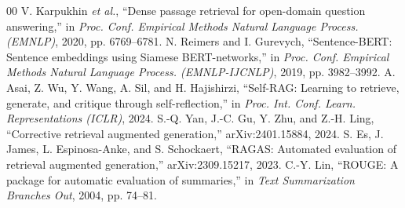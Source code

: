 \documentclass[conference]{IEEEtran}
\begin{document}
\begin{thebibliography}{00}
 V. Karpukhin \emph{et al.}, ``Dense passage retrieval for open-domain question answering,'' in \emph{Proc. Conf. Empirical Methods Natural Language Process. (EMNLP)}, 2020, pp. 6769--6781.
 N. Reimers and I. Gurevych, ``Sentence-BERT: Sentence embeddings using Siamese BERT-networks,'' in \emph{Proc. Conf. Empirical Methods Natural Language Process. (EMNLP-IJCNLP)}, 2019, pp. 3982--3992.
 A. Asai, Z. Wu, Y. Wang, A. Sil, and H. Hajishirzi, ``Self-RAG: Learning to retrieve, generate, and critique through self-reflection,'' in \emph{Proc. Int. Conf. Learn. Representations (ICLR)}, 2024.
 S.-Q. Yan, J.-C. Gu, Y. Zhu, and Z.-H. Ling, ``Corrective retrieval augmented generation,'' arXiv:2401.15884, 2024.
 S. Es, J. James, L. Espinosa-Anke, and S. Schockaert, ``RAGAS: Automated evaluation of retrieval augmented generation,'' arXiv:2309.15217, 2023.
 C.-Y. Lin, ``ROUGE: A package for automatic evaluation of summaries,'' in \emph{Text Summarization Branches Out}, 2004, pp. 74--81.
\end{thebibliography}
\end{document}
